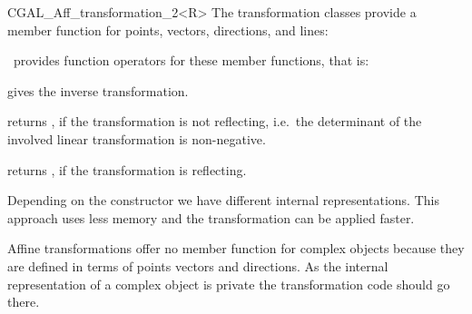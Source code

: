 \begin{classtemplate}{CGAL_Aff_transformation_2<R>}
The transformation classes provide a member function 
for points, vectors, directions, and lines:

       {}

       {}

       {}

       {}

\cgal\ provides function operators for these member functions,
that is:

       {}


\medskip


       {gives the inverse transformation.}


       {returns , if the transformation is not reflecting,
        i.e.\ the determinant of the involved linear transformation is
        non-negative.}

       {returns , if the transformation is reflecting.}




\implementation
Depending on the constructor we have different internal representations.
This approach uses less memory and the transformation can be applied
faster.

Affine transformations offer no  member function
for complex objects because they are defined in terms of  points vectors and 
directions.  As the internal representation of a complex object
is private the transformation code should go there.

\example


\end{classtemplate}
